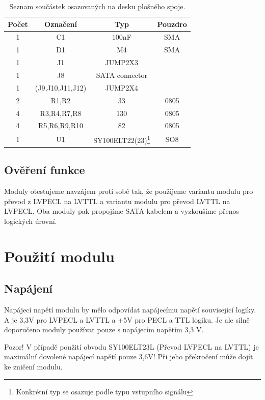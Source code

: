 \documentclass[12pt,a4paper,oneside]{article}
\begin{document}
\begin{savenotes}
\begin{table}[h!]
\begin{center}
\begin{tabular}{ |c|c|c|c| }
\hline 
Počet & Označení & Typ  & Pouzdro  \\ 
\hline 
1	&	C1	&	100nF	&	SMA \\ 
1	&	D1 	& 	M4 	& 	SMA \\ 
1	&	J1 	& JUMP2X3 &  \\ 
1	& 	J8 	& SATA connector &  \\
1	&	(J9,J10,J11,J12) & JUMP2X4 & \\
2	&	R1,R2	 & 33	& 0805\\
4	& 	R3,R4,R7,R8	&	130 & 0805\\
4	&	R5,R6,R9,R10	&	82 & 0805\\
1	&	U1	&	SY100ELT22(23)\footnote{Konkrétní typ se osazuje podle typu vstupního signálu} & SO8 \\
\hline 
\end{tabular}
\end{center}
\caption{Seznam součástek osazovaných na desku plošného spoje.}
\label{seznam_soucastek_galvanic_isolation}
\end{table}
\end{savenotes}



\subsection{Ověření funkce}

Moduly otestujeme navzájem proti sobě tak, že použijeme variantu modulu pro převod z LVPECL na LVTTL a variantu modulu pro převod LVTTL na LVPECL. Oba moduly pak propojíme SATA kabelem a vyzkoušíme přenos logických úrovní. 


\section{Použití modulu}

\subsection{Napájení}

Napájecí napětí modulu by mělo odpovídat napájecímu napětí související
logiky. A je 3,3V pro LVPECL a LVTTL a +5V pro PECL a TTL logiku. Je ale silně doporučeno moduly používat pouze s napájecím napětím 3,3 V.  

Pozor! V případě použití obvodu SY100ELT23L (Převod LVPECL na LVTTL) je
maximální dovolené napájecí napětí pouze 3,6V! Při jeho překročení může dojít
ke zničení modulu.
\end{document}
